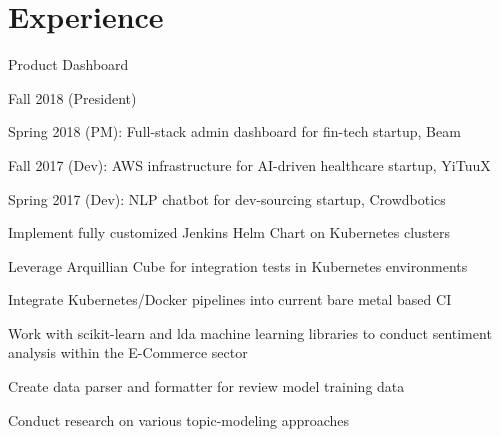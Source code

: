 \documentclass[]{deedy-resume}
\begin{document}
\begin{minipage}[t]{0.66\textwidth}


\section{Experience}
\sectionsep{}
\begin{tightemize}
  \item Product Dashboard
\end{tightemize}
\sectionsep{}

\begin{tightemize}
  \item Fall 2018 (President)
  \item Spring 2018 (PM): Full-stack admin dashboard for fin-tech startup, Beam
  \item Fall 2017 (Dev): AWS infrastructure for AI-driven healthcare startup, YiTuuX
  \item Spring 2017 (Dev): NLP chatbot for dev-sourcing startup, Crowdbotics
\end{tightemize}
\sectionsep{}

\sectionsep{}
\begin{tightemize}
  \item Implement fully customized Jenkins Helm Chart on Kubernetes clusters
  \item Leverage Arquillian Cube for integration tests in Kubernetes environments
  \item Integrate Kubernetes/Docker pipelines into current bare metal based CI
\end{tightemize}
\sectionsep{}

\begin{tightemize}
  \item Work with scikit-learn and lda machine learning libraries to conduct sentiment analysis within the E-Commerce sector
  \item Create data parser and formatter for review model training data
  \item Conduct research on various topic-modeling approaches
\end{tightemize}
\sectionsep{}


\end{minipage}
\end{document}
